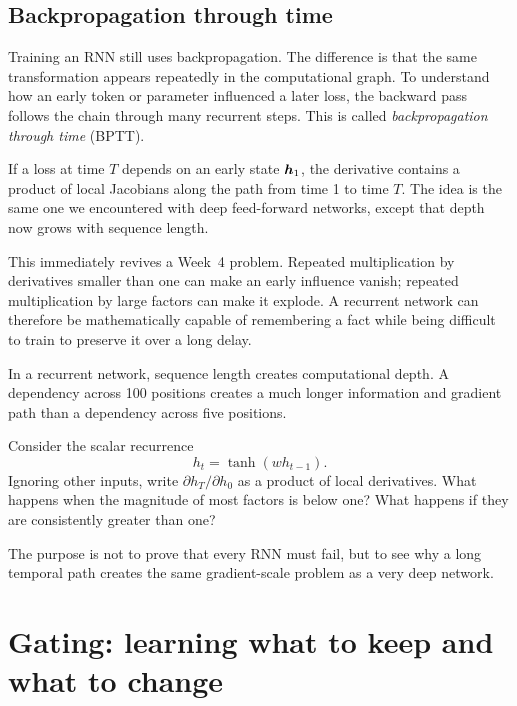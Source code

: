 \subsection{Backpropagation through time}

Training an RNN still uses backpropagation. The difference is that the same transformation appears repeatedly in the computational graph. To understand how an early token or parameter influenced a later loss, the backward pass follows the chain through many recurrent steps. This is called \emph{backpropagation through time} (BPTT).

If a loss at time \(T\) depends on an early state \(\bm{h}_1\), the derivative contains a product of local Jacobians along the path from time 1 to time \(T\). The idea is the same one we encountered with deep feed-forward networks, except that depth now grows with sequence length.

This immediately revives a Week~4 problem. Repeated multiplication by derivatives smaller than one can make an early influence vanish; repeated multiplication by large factors can make it explode. A recurrent network can therefore be mathematically capable of remembering a fact while being difficult to train to preserve it over a long delay.

\begin{keyidea}
In a recurrent network, sequence length creates computational depth. A dependency across 100 positions creates a much longer information and gradient path than a dependency across five positions.
\end{keyidea}

\begin{optionalexercise}[title={Optional mathematics --- why repeated derivatives matter}]
Consider the scalar recurrence
\[
  h_t = \tanh(w h_{t-1}).
\]
Ignoring other inputs, write \(\partial h_T/\partial h_0\) as a product of local derivatives. What happens when the magnitude of most factors is below one? What happens if they are consistently greater than one?

The purpose is not to prove that every RNN must fail, but to see why a long temporal path creates the same gradient-scale problem as a very deep network.
\end{optionalexercise}

\section{Gating: learning what to keep and what to change}

